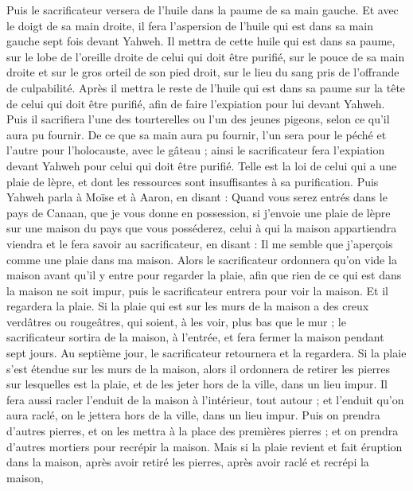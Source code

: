\begin{multicols}{2}
Puis le sacrificateur versera de l'huile dans la paume de sa main gauche.
Et avec le doigt de sa main droite, il fera l’aspersion de l'huile qui est dans sa main gauche sept fois devant Yahweh.
Il mettra de cette huile qui est dans sa paume, sur le lobe de l'oreille droite de celui qui doit être purifié, sur le pouce de sa main droite et sur le gros orteil de son pied droit, sur le lieu du sang pris de l'offrande de culpabilité.
Après il mettra le reste de l'huile qui est dans sa paume sur la tête de celui qui doit être purifié, afin de faire l’expiation pour lui devant Yahweh.
Puis il sacrifiera l'une des tourterelles ou l'un des jeunes pigeons, selon ce qu'il aura pu fournir.
De ce que sa main aura pu fournir, l'un sera pour le péché et l'autre pour l'holocauste, avec le gâteau ; ainsi le sacrificateur fera l’expiation  devant Yahweh pour celui qui doit être purifié.
Telle est la loi de celui qui a une plaie de lèpre, et dont les ressources sont insuffisantes à sa purification.
Puis Yahweh parla à Moïse et à Aaron, en disant :
Quand vous serez entrés dans le pays de Canaan, que je vous donne en possession, si j'envoie une plaie de lèpre sur une maison du pays que vous posséderez,
celui à qui la maison appartiendra viendra et le fera savoir au sacrificateur, en disant : Il me semble que j'aperçois comme une plaie dans ma maison.
Alors le sacrificateur ordonnera qu'on vide la maison avant qu'il y entre pour regarder la plaie, afin que rien de ce qui est dans la maison ne soit impur, puis le sacrificateur entrera pour voir la maison.
Et il regardera la plaie. Si la plaie qui est sur les murs de la maison a des creux verdâtres ou rougeâtres, qui soient, à les voir, plus bas que le mur ;
le sacrificateur sortira de la maison, à l'entrée, et fera fermer la maison pendant sept jours.
Au septième jour, le sacrificateur retournera et la regardera. Si la plaie s’est étendue sur les murs de la maison,
alors il ordonnera de retirer les pierres sur lesquelles est la plaie, et de les jeter hors de la ville, dans un lieu impur.
Il fera aussi racler l'enduit de la maison à l’intérieur, tout autour ; et l'enduit qu'on aura raclé, on le jettera hors de la ville, dans un lieu impur.
Puis on prendra d'autres pierres, et on les mettra à la place des premières pierres ; et on prendra d'autres mortiers pour recrépir la maison.
Mais si la plaie revient et fait éruption dans la maison, après avoir retiré les pierres, après avoir raclé et recrépi la maison,

\end{multicols}
